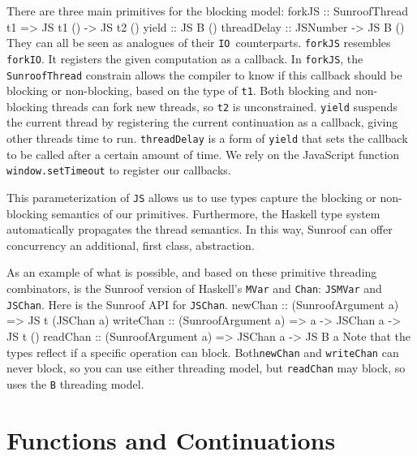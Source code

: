 \documentclass{llncs}
\newcommand{\Src}[1]{{\tt{#1}}}
\newcommand{\IO}{\Src{IO}}
\newenvironment{Code}{\verbatim}{\endverbatim}
\begin{document}
There are three main primitives for the blocking model:
\begin{Code}
forkJS      :: SunroofThread t1 => JS t1 () -> JS t2 ()
yield       :: JS B ()
threadDelay :: JSNumber -> JS B ()
\end{Code}
They can all be seen as analogues of their \IO~counterparts.
\Src{forkJS} resembles \Src{forkIO}.
It registers the given computation as a callback. 
In \Src{forkJS}, the \Src{SunroofThread} constrain allows the compiler
to know if this callback should be blocking or non-blocking,
based on the type of \Src{t1}. Both blocking and non-blocking
threads can fork new threads, so \Src{t2} is unconstrained.
\Src{yield} suspends the current thread by 
registering the current continuation as a callback,
giving other threads time to run.
\Src{threadDelay} is a form of \Src{yield} that sets 
the callback to be called after a certain amount of time.
We rely on the JavaScript function \Src{window.setTimeout} 
\cite{whatwg:timers} to register our callbacks.

This parameterization of \Src{JS} allows us to use types capture
the blocking or non-blocking semantics of our primitives.
Furthermore, the Haskell type system automatically propagates
the thread semantics. In this way, Sunroof can offer concurrency
an additional, first class, abstraction.

As an example of what is possible, and based on these primitive
threading combinators, is the Sunroof
version of Haskell's \Src{MVar} and \Src{Chan}: \Src{JSMVar} and \Src{JSChan}.
Here is the Sunroof API for \Src{JSChan}.
\begin{Code}
newChan   :: (SunroofArgument a) => JS t (JSChan a)
writeChan :: (SunroofArgument a) => a -> JSChan a -> JS t ()
readChan  :: (SunroofArgument a) => JSChan a -> JS B a
\end{Code}
Note that the types reflect if a specific operation can block.
Both\Src{newChan} and \Src{writeChan} can never block, so you can use either threading model,
but \Src{readChan} may block, so uses the \Src{B} threading model.


\section{Functions and Continuations}
\label{sec:functions-continuations}
\end{document}
